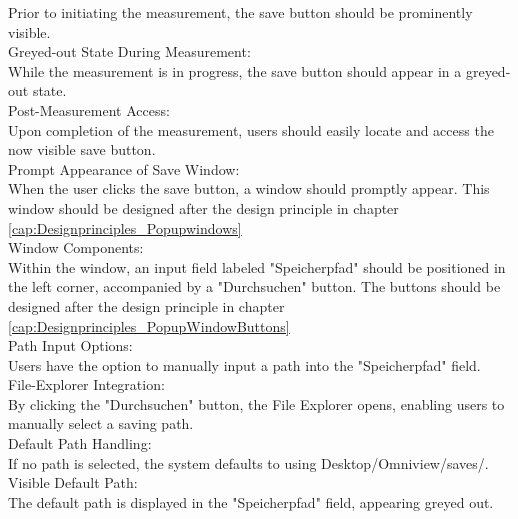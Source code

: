 \documentclass{scrreprt}
\begin{document}
Prior to initiating the measurement, the save button should be prominently visible.\\

Greyed-out State During Measurement:\\

While the measurement is in progress, the save button should appear in a greyed-out state.\\

Post-Measurement Access:\\

Upon completion of the measurement, users should easily locate and access the now visible save button.\\

Prompt Appearance of Save Window:\\

When the user clicks the save button, a window should promptly appear. This window should be designed after the design principle in chapter \ref{cap:Designprinciples_Popupwindows}\\

Window Components:\\

Within the window, an input field labeled "Speicherpfad" should be positioned in the left corner, accompanied by a "Durchsuchen" button. The buttons should be designed after the design principle in chapter \ref{cap:Designprinciples_PopupWindowButtons}\\

Path Input Options:\\

Users have the option to manually input a path into the "Speicherpfad" field.\\

File-Explorer Integration:\\

By clicking the "Durchsuchen" button, the File Explorer opens, enabling users to manually select a saving path.\\

Default Path Handling:\\

If no path is selected, the system defaults to using Desktop/Omniview/saves/.\\

Visible Default Path:\\

The default path is displayed in the "Speicherpfad" field, appearing greyed out.\\
\end{document}

